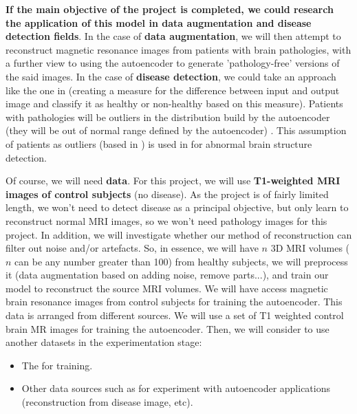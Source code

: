 \textbf{If the main objective of the project is completed, we could research the application of this model in data augmentation and disease detection fields}. In the case of \textbf{data augmentation}, we will then attempt to reconstruct magnetic resonance images from patients with brain pathologies, with a further view to using the autoencoder to generate 'pathology-free' versions of the said images. In the case of \textbf{disease detection}, we could take an approach like the one in \cite{pinaya2019} (creating a measure for the difference between input and output image and classify it as healthy or non-healthy based on this measure). Patients with pathologies will be outliers in the distribution build by the autoencoder (they will be out of normal range defined by the autoencoder) \cite{marquand2016normative} \cite{mourao2011outlier}. This assumption of patients as outliers (based in \cite{mourao2011outlier}) is used in \cite{pinaya2019} for abnormal brain structure detection.

Of course, we will need \textbf{data}. For this project, we will use \textbf{T1-weighted MRI images of control subjects} (no disease). As the project is of fairly limited length, we won't need to detect disease as a principal objective, but only learn to reconstruct normal MRI images, so we won't need pathology images for this project. In addition, we will investigate whether our method of reconstruction can filter out noise and/or artefacts. So, in essence, we will have $n$ 3D MRI volumes ($n$ can be any number greater than 100) from healthy subjects, we will preprocess it (data augmentation based on adding noise, remove parts...), and train our model to reconstruct the source MRI volumes. We will have access magnetic brain resonance images from control subjects for training the autoencoder. This data is arranged from different sources. We will use a set of T1 weighted control brain MR images for training the autoencoder. Then, we will consider to use another datasets in the experimentation stage:

\begin{itemize}
    \item The  for training.
    \item Other data sources such as  for experiment with autoencoder applications (reconstruction from disease image, etc).
\end{itemize}



